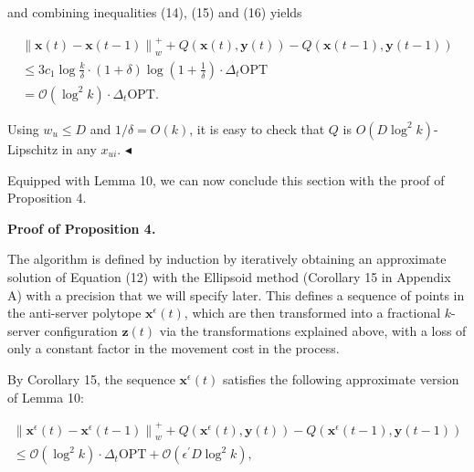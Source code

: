 \documentclass[10pt,a4paper]{article}
\begin{document}
and combining inequalities (14), (15) and (16) yields\par


\[\begin{gathered}
\displaystyle\left\|{\boldsymbol{x}}(t)-{\boldsymbol{x}}(t-1)\right\|_{w}^{+} \displaystyle+Q({\boldsymbol{x}}(t),{\boldsymbol{y}}(t))-Q({\boldsymbol{x}}(t-1),{\boldsymbol{y}}(t-1)) \\
\displaystyle\leq 3c_{1}\log\frac{k}{\delta}\cdot(1+\delta)\log\left(1+\frac{1}{\delta}\right)\cdot\Delta_{t}{\text{OPT}} \\
\displaystyle=\mathcal{O}\left(\log^{2}k\right)\cdot\Delta_{t}{\text{OPT}}.
\end{gathered}\]


Using $w_{u}\leq D$ and $1/\delta=O(k)$, it is easy to check that $Q$ is $O(D\log^{2}k)$-Lipschitz in any $x_{ui}$.
$\blacktriangleleft$\par




Equipped with Lemma 10, we can now conclude this section with the proof of Proposition 4.\par





\par\medskip\noindent\textbf{Proof of Proposition 4.}\par




The algorithm is defined by induction by iteratively obtaining an approximate solution of Equation (12) with the Ellipsoid method (Corollary 15 in Appendix A) with a precision that we will specify later. This defines a sequence of points in the anti-server polytope ${\boldsymbol{x}}^{\epsilon}(t)$, which are then transformed into a fractional $k$-server configuration ${\mathbf{z}}(t)$ via the transformations explained above, with a loss of only a constant factor in the movement cost in the process.\par




By Corollary 15, the sequence ${\boldsymbol{x}}^{\epsilon}(t)$ satisfies the following approximate version of Lemma 10:\par


\[\begin{gathered}
\displaystyle\left\|{\boldsymbol{x}}^{\epsilon}(t)-{\boldsymbol{x}}^{\epsilon}(t-1)\right\|_{w}^{+}+Q({\boldsymbol{x}}^{\epsilon}(t),{\boldsymbol{y}}(t))-Q \displaystyle({\boldsymbol{x}}^{\epsilon}(t-1),{\boldsymbol{y}}(t-1)) \\
\displaystyle\leq\mathcal{O}\left(\log^{2}k\right)\cdot\Delta_{t}{\text{OPT}}+\mathcal{O}(\epsilon^{\prime}D\log^{2}k),
\end{gathered}\]
\end{document}
